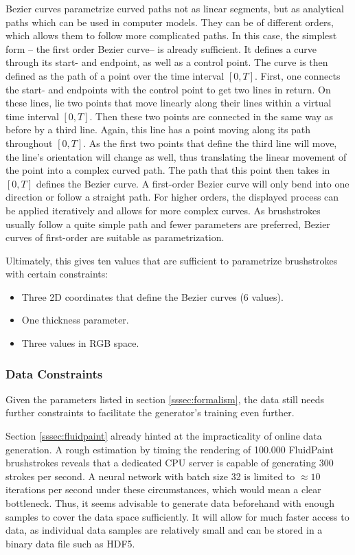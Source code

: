 Bezier curves parametrize curved paths not as linear segments, but as analytical paths which can be used in computer models.
They can be of different orders, which allows them to follow more complicated paths.
In this case, the simplest form -- the first order Bezier curve-- is already sufficient.
It defines a curve through its start- and endpoint, as well as a control point.
The curve is then defined as the path of a point over the time interval $[0, T]$.
First, one connects the start- and endpoints with the control point to get two lines in return.
On these lines, lie two points that move linearly along their lines within a virtual time interval $[0, T]$.
Then these two points are connected in the same way as before by a third line.
Again, this line has a point moving along its path throughout $[0, T]$.
As the first two points that define the third line will move, the line's orientation will change as well, thus translating the linear movement of the point into a complex curved path.
The path that this point then takes in $[0, T]$ defines the Bezier curve.
A first-order Bezier curve will only bend into one direction or follow a straight path.
For higher orders, the displayed process can be applied iteratively and allows for more complex curves.
As brushstrokes usually follow a quite simple path and fewer parameters are preferred, Bezier curves of first-order are suitable as parametrization.

Ultimately, this gives ten values that are sufficient to parametrize brushstrokes with certain constraints:
\begin{itemize}
    \item Three 2D coordinates that define the Bezier curves (6 values).
    \item One thickness parameter.
    \item Three values in RGB space.
\end{itemize}


\subsubsection{Data Constraints}

Given the parameters listed in section \ref{sssec:formalism}, the data still needs further constraints to facilitate the generator's training even further.

Section \ref{sssec:fluidpaint} already hinted at the impracticality of online data generation.
A rough estimation by timing the rendering of 100.000 FluidPaint brushstrokes reveals that a dedicated CPU server is capable of generating 300 strokes per second.
A neural network with batch size 32 is limited to $\approx 10$ iterations per second under these circumstances, which would mean a clear bottleneck.
Thus, it seems advisable to generate data beforehand with enough samples to cover the data space sufficiently.
It will allow for much faster access to data, as individual data samples are relatively small and can be stored in a binary data file such as HDF5.


